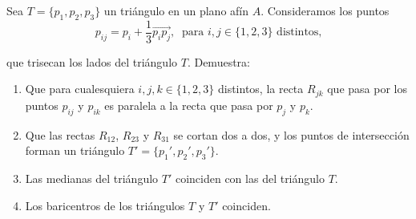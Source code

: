 \documentclass[12pt]{article}
\begin{document}
   \begin{ejercicio}[4 puntos]
        Sea $T=\{p_1,p_2,p_3\}$ un triángulo en un plano afín $A$. Consideramos los puntos 
        \[
            p_{ij}=p_i + \dfrac{1}{3}\vec{p_ip_j},\ \text{ para }i,j\in\{1,2,3\} \text{ distintos,}
        \]

        que trisecan los lados del triángulo $T$. Demuestra:
        \begin{enumerate}
            \item Que para cualesquiera $i,j,k\in \{1,2,3\}$ distintos, la recta $R_{jk}$ que pasa por los puntos $p_{ij}$ y $p_{ik}$ es paralela a la recta que pasa por $p_{j}$ y $p_{k}$.
            \item Que las rectas $R_{12}$, $R_{23}$ y $R_{31}$ se cortan dos a dos, y los puntos de intersección forman un triángulo $T'=\{p_1',p_2',p_3'\}$.
            \item Las medianas del triángulo $T'$ coinciden con las del triángulo $T$.
            \item Los baricentros de los triángulos $T$ y $T'$ coinciden.
        \end{enumerate}
   \end{ejercicio}

     
\end{document}
